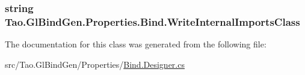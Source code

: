 \label{class_tao_1_1_gl_bind_gen_1_1_properties_1_1_bind_a15f2e3b0f20d1f3cb941494dad332d1b}
\hypertarget{class_tao_1_1_gl_bind_gen_1_1_properties_1_1_bind_acd5042d86d1e6276191ea43639edf797}{
\subsubsection[{WriteInternalImportsClass}]{\setlength{\rightskip}{0pt plus 5cm}string Tao.GlBindGen.Properties.Bind.WriteInternalImportsClass}}
\label{class_tao_1_1_gl_bind_gen_1_1_properties_1_1_bind_acd5042d86d1e6276191ea43639edf797}


The documentation for this class was generated from the following file:\begin{DoxyCompactItemize}
\item 
src/Tao.GlBindGen/Properties/\hyperlink{_bind_8_designer_8cs}{Bind.Designer.cs}\end{DoxyCompactItemize}
